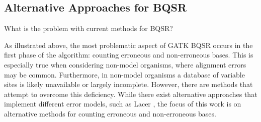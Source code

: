 \documentclass{article}
\begin{document}
\subsection{Alternative Approaches for BQSR}

\begin{outline}
	\item What is the problem with current methods for BQSR?
	\begin{outline}
		\item As illustrated above, the most problematic aspect of GATK BQSR occurs in the first phase of the algorithm: counting erroneous and non-erroneous bases. This is especially true when considering non-model organisms, where alignment errors may be common. Furthermore, in non-model organisms a database of variable sites is likely unavailable or largely incomplete. However, there are methods that attempt to overcome this deficiency. While there exist alternative approaches that implement different error models, such as Lacer \parencite{chung_lacer:_2017}, the focus of this work is on alternative methods for counting erroneous and non-erroneous bases.



\end{outline}
\end{outline}
\end{document}
